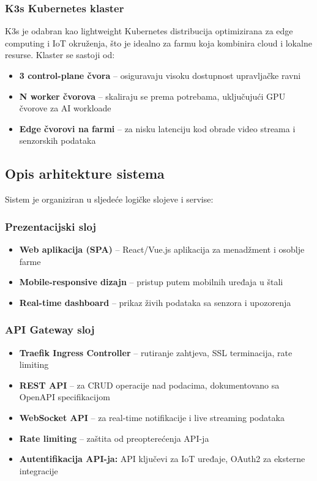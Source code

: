 \documentclass{article}
\begin{document}
\subsubsection{K3s Kubernetes klaster}

K3s je odabran kao lightweight Kubernetes distribucija optimizirana za edge computing i IoT okruženja, što je idealno za farmu koja kombinira cloud i lokalne resurse. Klaster se sastoji od:

\begin{itemize}
    \item \textbf{3 control-plane čvora} -- osiguravaju visoku dostupnost upravljačke ravni
    \item \textbf{N worker čvorova} -- skaliraju se prema potrebama, uključujući GPU čvorove za AI workloade
    \item \textbf{Edge čvorovi na farmi} -- za nisku latenciju kod obrade video streama i senzorskih podataka
\end{itemize}

\subsection{Opis arhitekture sistema}

Sistem je organiziran u sljedeće logičke slojeve i servise:

\subsubsection{Prezentacijski sloj}

\begin{itemize}
    \item \textbf{Web aplikacija (SPA)} -- React/Vue.js aplikacija za menadžment i osoblje farme
    \item \textbf{Mobile-responsive dizajn} -- pristup putem mobilnih uređaja u štali
    \item \textbf{Real-time dashboard} -- prikaz živih podataka sa senzora i upozorenja
\end{itemize}

\subsubsection{API Gateway sloj}

\begin{itemize}
    \item \textbf{Traefik Ingress Controller} -- rutiranje zahtjeva, SSL terminacija, rate limiting
    \item \textbf{REST API} -- za CRUD operacije nad podacima, dokumentovano sa OpenAPI specifikacijom
    \item \textbf{WebSocket API} -- za real-time notifikacije i live streaming podataka
    \item \textbf{Rate limiting} -- zaštita od preopterećenja API-ja
    \item \textbf{Autentifikacija API-ja:} API ključevi za IoT uređaje, OAuth2 za eksterne integracije
\end{itemize}
\end{document}
